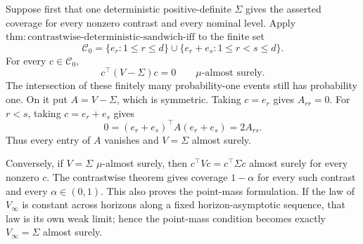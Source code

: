 Suppose first that one deterministic positive-definite \(\Sigma\) gives the
asserted coverage for every nonzero contrast and every nominal level.  Apply
\(\mathrm{thm:contrastwise\text{-}deterministic\text{-}sandwich\text{-}iff}\)
to the finite set
\[
 \mathcal C_0=\{e_r:1\le r\le d\}\cup
 \{e_r+e_s:1\le r<s\le d\}.
\tag{1}
\]
For every \(c\in\mathcal C_0\),
\[
 c^\top(V-\Sigma)c=0\qquad\mu\text{-almost surely}.
\tag{2}
\]
The intersection of these finitely many probability-one events still has
probability one.  On it put \(A=V-\Sigma\), which is symmetric.  Taking
\(c=e_r\) gives \(A_{rr}=0\).  For \(r<s\), taking \(c=e_r+e_s\) gives
\[
 0=(e_r+e_s)^\top A(e_r+e_s)=2A_{rs}.
\tag{3}
\]
Thus every entry of \(A\) vanishes and \(V=\Sigma\) almost surely.

Conversely, if \(V=\Sigma\) \(\mu\)-almost surely, then
\(c^\top Vc=c^\top\Sigma c\) almost surely for every nonzero \(c\).  The
contrastwise theorem gives coverage \(1-\alpha\) for every such contrast and
every \(\alpha\in(0,1)\).  This also proves the point-mass formulation.  If
the law of \(V_\infty\) is constant across horizons along a fixed
horizon-asymptotic sequence, that law is its own weak limit; hence the
point-mass condition becomes exactly \(V_\infty=\Sigma\) almost surely.